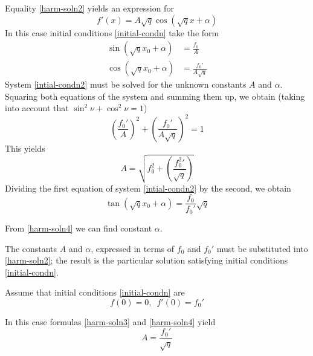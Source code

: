 Equality \eqref{harm-soln2} yields an expression for 
 \begin{equation*}%
f'(x) = A \sqrt{q} \cos (\sqrt{q}x + \alpha )
\end{equation*}
In this case initial conditions \eqref{initial-condn} take the form 
\begin{equation}%
\begin{split}
\sin (\sqrt{q} x_{0} + \alpha) & = \frac{f_{0}}{A} \\
\cos (\sqrt{q} x_{0} + \alpha) & = \frac{f_{0}'}{A \sqrt{q}} 
\end{split}
\label{intial-condn2}
\end{equation}
System \eqref{intial-condn2} must be solved for the unknown constants $A$ and $\alpha$. Squaring both equations of the system and summing them up, we obtain (taking into account that $\sin^{2} \nu + \cos^{2} \nu = 1$)
 \begin{equation*}%
\left( \dfrac{f_{0}'}{A} \right)^{2} + \left( \frac{f_{0}'}{A \sqrt{q}}\right)^{2} = 1
\end{equation*}
This yields
\begin{equation}%
A  = \sqrt{f_{0}^{2} + \left( \dfrac{f^{2}_{0}\prime}{\sqrt{q}} \right)}
 \label{harm-soln3}
\end{equation}
Dividing the first equation of system \eqref{intial-condn2} by the second,
we obtain 
\begin{equation}%
\tan (\sqrt{q} x_{0} + \alpha) = \dfrac{f_{0}}{f_{0}\prime} \sqrt{q}
 \label{harm-soln4}
\end{equation}


From \eqref{harm-soln4} we can find constant $\alpha$.

The constants $A$ and $\alpha$, expressed in terms of $f_{0 }$ and $f_{0}\prime$ must be substituted into \eqref{harm-soln2}; the result is the particular solution satisfying initial conditions \eqref{initial-condn}.

\athr Assume that initial conditions \eqref{initial-condn} are 
\begin{equation}%
f(0)= 0, \,\,\, f\prime(0)= f_{0}'
\label{intial-condn3}
\end{equation}

\rdr In this case formulas \eqref{harm-soln3} and \eqref{harm-soln4} yield
\begin{equation}%
A = \dfrac{f_{0}\prime}{\sqrt{q}}
\label{harm-soln5}
\end{equation}

